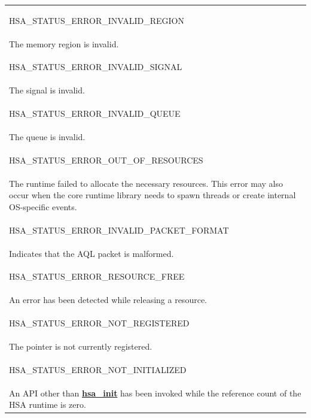 \documentclass[final]{book}
\newcommand{\reffun}[1]{\textbf{#1}}
\newcommand{\reftyp}[1]{#1}
\newcommand{\refenu}[1]{\reftyp{#1}}
\begin{document}
\begin{longtable}{@{\hspace{2em}}p{\linewidth-2em}}
\hspace{-2em}\hypertarget{group__status_1ggad755322e7ff95456520e8abdbe90d225ad63594ac02edec7ae7aa7722c11afcd9}{\refenu{HSA_\-STATUS_\-ERROR_\-INVALID_\-REGION}} \\The memory region is invalid.\\[2mm]
\hspace{-2em}\hypertarget{group__status_1ggad755322e7ff95456520e8abdbe90d225a7b4c8c0d4c99a1fe966abc2d39b575fe}{\refenu{HSA_\-STATUS_\-ERROR_\-INVALID_\-SIGNAL}} \\The signal is invalid.\\[2mm]
\hspace{-2em}\hypertarget{group__status_1ggad755322e7ff95456520e8abdbe90d225aa3c762eb6a61b358702b45259d1686c4}{\refenu{HSA_\-STATUS_\-ERROR_\-INVALID_\-QUEUE}} \\The queue is invalid.\\[2mm]
\hspace{-2em}\hypertarget{group__status_1ggad755322e7ff95456520e8abdbe90d225a1a77fcf36d0d140874c4361ab093eff7}{\refenu{HSA_\-STATUS_\-ERROR_\-OUT_\-OF_\-RESOURCES}} \\The runtime failed to allocate the necessary resources. This error may also occur when the core runtime library needs to spawn threads or create internal OS-specific events.\\[2mm]
\hspace{-2em}\hypertarget{group__status_1ggad755322e7ff95456520e8abdbe90d225a3fad45f72111eb99de5d8daef26c372c}{\refenu{HSA_\-STATUS_\-ERROR_\-INVALID_\-PACKET_\-FORMAT}} \\Indicates that the AQL packet is malformed.\\[2mm]
\hspace{-2em}\hypertarget{group__status_1ggad755322e7ff95456520e8abdbe90d225a6406af88203fcbec4179fbb71cc66b65}{\refenu{HSA_\-STATUS_\-ERROR_\-RESOURCE_\-FREE}} \\An error has been detected while releasing a resource.\\[2mm]
\hspace{-2em}\hypertarget{group__status_1ggad755322e7ff95456520e8abdbe90d225a8b2f486dd206aa5545e8b0f2c1e2a568}{\refenu{HSA_\-STATUS_\-ERROR_\-NOT_\-REGISTERED}} \\The pointer is not currently registered.\\[2mm]
\hspace{-2em}\hypertarget{group__status_1ggad755322e7ff95456520e8abdbe90d225a34ea59ade5bfce95eee935238a99f5b5}{\refenu{HSA_\-STATUS_\-ERROR_\-NOT_\-INITIALIZED}} \\An API other than \hyperlink{group__initshutdown_1ga5b8574433e7dbcbd31ea397a02e3c32b}{\reffun{hsa_\-init}} has been invoked while the reference count of the HSA runtime is zero.\\[2mm]

\end{longtable}
\end{document}
